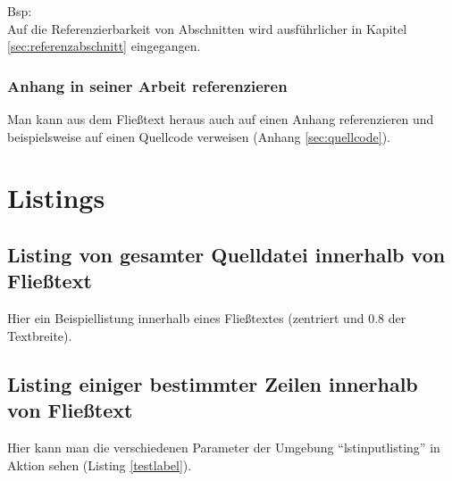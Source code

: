 Bsp:\\
Auf die Referenzierbarkeit von Abschnitten wird ausführlicher in Kapitel \ref{sec:referenzabschnitt} eingegangen. 

\subsubsection{Anhang in seiner Arbeit referenzieren}
Man kann aus dem Fließtext heraus auch auf einen Anhang referenzieren und beispielsweise auf einen Quellcode verweisen (\vgl Anhang \ref{sec:quellcode}). 


\section{Listings}

\subsection{Listing von gesamter Quelldatei innerhalb von Fließtext}
Hier ein Beispiellistung innerhalb eines Fließtextes (zentriert und 0.8 der Textbreite).

\begin{center}

	\vspace{5mm}
	
		\begin{minipage}{.8\textwidth}		
			
			
			
			
		\end{minipage}

	\vspace{5mm}

\end{center}

\subsection{Listing einiger bestimmter Zeilen innerhalb von Fließtext}
Hier kann man die verschiedenen Parameter der Umgebung "`lstinputlisting"' in Aktion sehen (\vgl Listing \ref{testlabel}).

